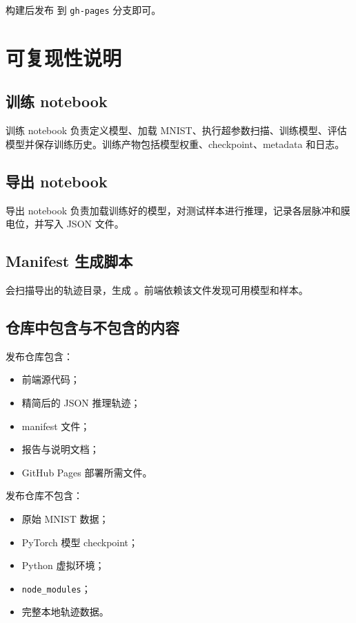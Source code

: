 \documentclass[UTF8,11pt,a4paper]{ctexart}
\begin{document}
构建后发布  到 \texttt{gh-pages} 分支即可。

\section{可复现性说明}

\subsection{训练 notebook}

训练 notebook 负责定义模型、加载 MNIST、执行超参数扫描、训练模型、评估模型并保存训练历史。训练产物包括模型权重、checkpoint、metadata 和日志。

\subsection{导出 notebook}

导出 notebook 负责加载训练好的模型，对测试样本进行推理，记录各层脉冲和膜电位，并写入 JSON 文件。

\subsection{Manifest 生成脚本}

 会扫描导出的轨迹目录，生成 。前端依赖该文件发现可用模型和样本。

\subsection{仓库中包含与不包含的内容}

发布仓库包含：

\begin{itemize}
    \item 前端源代码；
    \item 精简后的 JSON 推理轨迹；
    \item manifest 文件；
    \item 报告与说明文档；
    \item GitHub Pages 部署所需文件。
\end{itemize}

发布仓库不包含：

\begin{itemize}
    \item 原始 MNIST 数据；
    \item PyTorch 模型 checkpoint；
    \item Python 虚拟环境；
    \item \texttt{node\_modules}；
    \item 完整本地轨迹数据。
\end{itemize}
\end{document}

